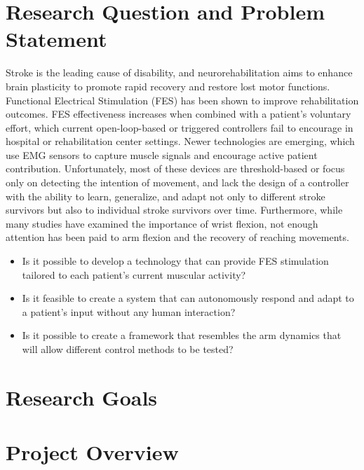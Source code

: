 \section{Research Question and Problem Statement}

Stroke is the leading cause of disability, and neurorehabilitation aims to enhance brain plasticity to promote rapid recovery and restore lost motor functions. Functional Electrical Stimulation (FES) has been shown to improve rehabilitation outcomes. FES effectiveness increases when combined with a patient's voluntary effort, which current open-loop-based or triggered controllers fail to encourage in hospital or rehabilitation center settings. Newer technologies are emerging, which use EMG sensors to capture muscle signals and encourage active patient contribution. Unfortunately, most of these devices are threshold-based or focus only on detecting the intention of movement, and lack the design of a controller with the ability to learn, generalize, and adapt not only to different stroke survivors but also to individual stroke survivors over time. Furthermore, while many studies have examined the importance of wrist flexion, not enough attention has been paid to arm flexion and the recovery of reaching movements.

\begin{itemize}
    \item Is it possible to develop a technology that can provide FES stimulation tailored to each patient's current muscular activity?
    \item Is it feasible to create a system that can autonomously respond and adapt to a patient's input without any human interaction?
    \item Is it possible to create a framework that resembles the arm dynamics that will allow different control methods to be tested?
\end{itemize}

\section{Research Goals}


\section{Project Overview}

